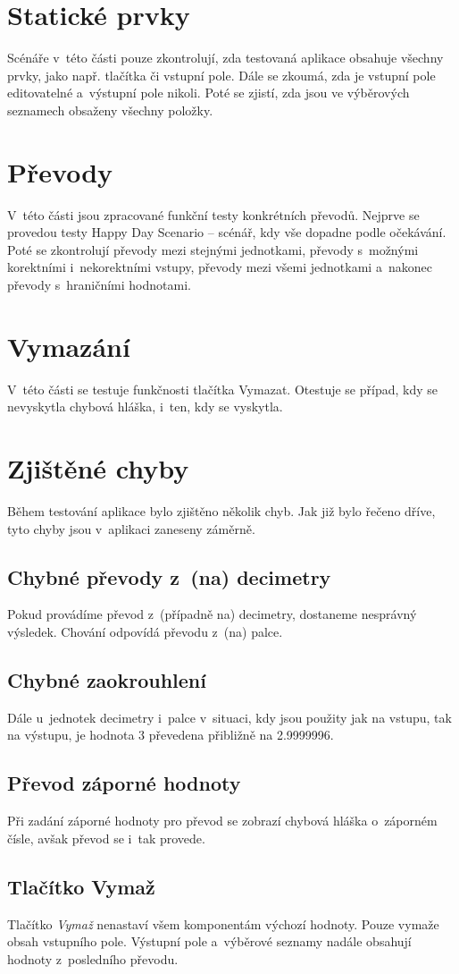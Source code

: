 	\section{Statické prvky}
	Scénáře v~této části pouze zkontrolují, zda testovaná aplikace obsahuje všechny prvky, jako např. tlačítka či vstupní pole. Dále se zkoumá, zda je vstupní pole editovatelné a~výstupní pole nikoli. Poté se zjistí, zda jsou ve výběrových seznamech obsaženy všechny položky.
	
	\section{Převody}
	V~této části jsou zpracované funkční testy konkrétních převodů. Nejprve se provedou testy Happy Day Scenario -- scénář, kdy vše dopadne podle očekávání. Poté se zkontrolují převody mezi stejnými jednotkami, převody s~možnými korektními i~nekorektními vstupy, převody mezi všemi jednotkami a~nakonec převody s~hraničními hodnotami.
	
	\section{Vymazání}
	V~této části se testuje funkčnosti tlačítka Vymazat. Otestuje se případ, kdy se nevyskytla chybová hláška, i~ten, kdy se vyskytla.
	
	\section{Zjištěné chyby}
	Během testování aplikace bylo zjištěno několik chyb. Jak již bylo řečeno dříve, tyto chyby jsou v~aplikaci zaneseny záměrně.
	
		\subsection{Chybné převody z~(na) decimetry}
		Pokud provádíme převod z~(případně na) decimetry, dostaneme nesprávný výsledek. Chování odpovídá převodu z~(na) palce.
		
		\subsection{Chybné zaokrouhlení}
		Dále u~jednotek decimetry i~palce v~situaci, kdy jsou použity jak na vstupu, tak na výstupu, je hodnota 3 převedena přibližně na 2.9999996.
		
		\subsection{Převod záporné hodnoty}
		Při zadání záporné hodnoty pro převod se zobrazí chybová hláška o~záporném čísle, avšak převod se i~tak provede.
		
		\subsection{Tlačítko Vymaž}
		Tlačítko \textit{Vymaž} nenastaví všem komponentám výchozí hodnoty. Pouze vymaže obsah vstupního pole. Výstupní pole a~výběrové seznamy nadále obsahují hodnoty z~posledního převodu.